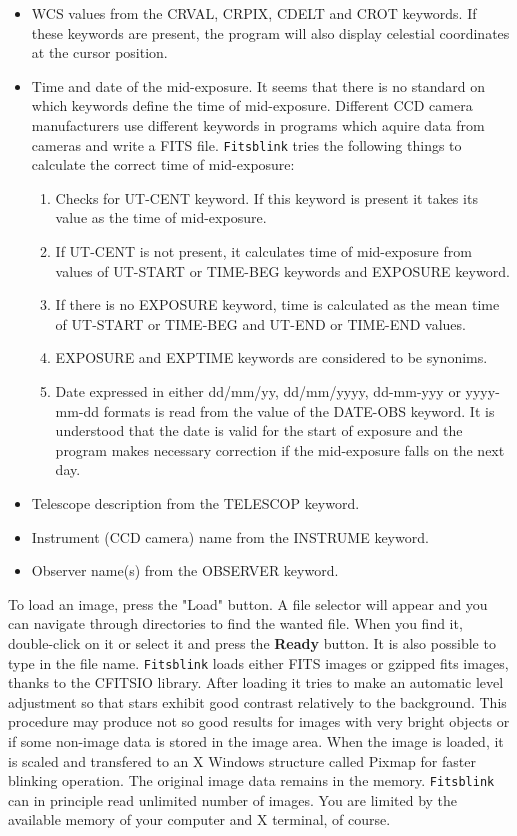 \documentclass[11pt]{article}
\begin{document}
\begin{itemize}
\item WCS values from the CRVAL, CRPIX, CDELT and CROT keywords.  If
these keywords are present, the program will also display celestial
coordinates at the cursor position.
\item Time and date of the mid-exposure.  It seems that there is no
standard on which keywords define the time of mid-exposure.  Different
CCD camera manufacturers use different keywords in programs which
aquire data from cameras and write a FITS file.  \verb=Fitsblink=
tries the following things to calculate the correct time of
mid-exposure: 
\begin{enumerate}
\item Checks for UT-CENT keyword.  If this keyword is present it takes
its value as the time of mid-exposure.
\item If UT-CENT is not present, it calculates time of mid-exposure
from values of UT-START or TIME-BEG keywords and EXPOSURE keyword.
\item If there is no EXPOSURE keyword, time is calculated as the mean
time of UT-START or TIME-BEG and UT-END or TIME-END values.
\item EXPOSURE and EXPTIME keywords are considered to be synonims.
\item Date expressed in either dd/mm/yy, dd/mm/yyyy, dd-mm-yyy or
yyyy-mm-dd formats is read from the value of the DATE-OBS keyword.  It
is understood that the date is valid for the start of exposure and the
program makes necessary correction if the mid-exposure falls on the
next day.
\end{enumerate}
\item Telescope description from the TELESCOP keyword.
\item Instrument (CCD camera) name from the INSTRUME keyword.
\item Observer name(s) from the OBSERVER keyword.
\end{itemize}

To load an image, press the "Load" button.  A file selector will
appear and you can navigate through directories to find the wanted
file.  When you find it, double-click on it or select it and press the
\textbf{Ready} button.  It is also possible to type in the file name.
\verb=Fitsblink= loads either FITS images or gzipped fits images,
thanks to the CFITSIO library.  After loading it tries to make an
automatic level adjustment so that stars exhibit good contrast
relatively to the background.  This procedure may produce not so good
results for images with very bright objects or if some non-image data
is stored in the image area.  When the image is loaded, it is scaled
and transfered to an X Windows structure called Pixmap for faster
blinking operation.  The original image data remains in the memory.
\verb=Fitsblink= can in principle read unlimited number of images.
You are limited by the available memory of your computer and X
terminal, of course.
\end{document}
